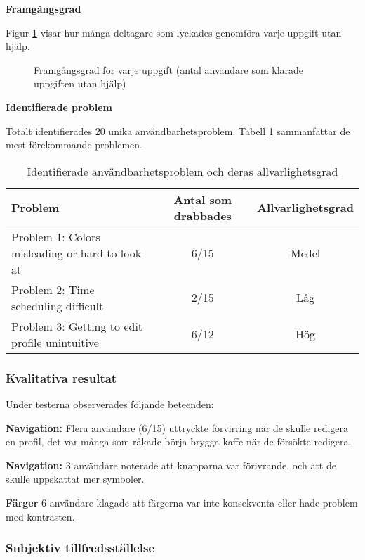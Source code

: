 \textbf{Framgångsgrad}

Figur \ref{fig:success_rate} visar hur många deltagare som lyckades genomföra varje uppgift utan hjälp.

\begin{figure}[ht]
    \centering
    \caption{Framgångsgrad för varje uppgift (antal användare som klarade uppgiften utan hjälp)}
    \label{fig:success_rate}
\end{figure}

\textbf{Identifierade problem}

Totalt identifierades 20 unika användbarhetsproblem. Tabell \ref{tab:problem} sammanfattar de mest förekommande problemen.
\begin{table}[h]
\centering
\begin{tabular}{|p{6cm}|c|c|}
\hline
\textbf{Problem} & \textbf{Antal som drabbades} & \textbf{Allvarlighetsgrad} \\
\hline
Problem 1: Colors misleading or hard to look at & 6/15 & Medel\\
Problem 2: Time scheduling difficult & 2/15 &  Låg \\
Problem 3: Getting to edit profile unintuitive & 6/12 & Hög\\
\hline
\end{tabular}
\caption{Identifierade användbarhetsproblem och deras allvarlighetsgrad}
\label{tab:problem}
\end{table}


\subsubsection{Kvalitativa resultat}

Under testerna observerades följande beteenden:

\textbf{Navigation:} Flera användare (6/15) uttryckte förvirring när de skulle redigera en profil, det var många som råkade börja brygga kaffe när de försökte redigera.

\textbf{Navigation:} 3 användare noterade att knapparna var förivrande, och att de skulle uppskattat mer symboler. 

\textbf{Färger} 6 användare klagade att färgerna var inte konsekventa eller hade problem med kontrasten. 


\subsubsection{Subjektiv tillfredsställelse}

